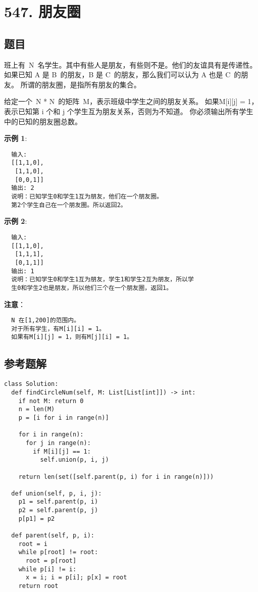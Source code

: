 \newpage
\section{547. 朋友圈}
\label{leetcode:547}

\subsection{题目}

班上有 N 名学生。其中有些人是朋友，有些则不是。他们的友谊具有是传递性。
如果已知 A 是 B 的朋友，B 是 C 的朋友，那么我们可以认为 A 也是 C 的朋友。
所谓的朋友圈，是指所有朋友的集合。

给定一个 N * N 的矩阵 M，表示班级中学生之间的朋友关系。
如果M[i][j] = 1，表示已知第 i 个和 j 个学生互为朋友关系，否则为不知道。
你必须输出所有学生中的已知的朋友圈总数。

\textbf{示例 1}:

\begin{verbatim}
  输入:
  [[1,1,0],
   [1,1,0],
   [0,0,1]]
  输出: 2
  说明：已知学生0和学生1互为朋友，他们在一个朋友圈。
  第2个学生自己在一个朋友圈。所以返回2。
\end{verbatim}

\textbf{示例 2}:

\begin{verbatim}
  输入:
  [[1,1,0],
   [1,1,1],
   [0,1,1]]
  输出: 1
  说明：已知学生0和学生1互为朋友，学生1和学生2互为朋友，所以学
  生0和学生2也是朋友，所以他们三个在一个朋友圈，返回1。
\end{verbatim}

\textbf{注意}：

\begin{verbatim}
  N 在[1,200]的范围内。
  对于所有学生，有M[i][i] = 1。
  如果有M[i][j] = 1，则有M[j][i] = 1。
\end{verbatim}

\subsection{参考题解}

\begin{verbatim}
class Solution:
  def findCircleNum(self, M: List[List[int]]) -> int:
    if not M: return 0
    n = len(M)
    p = [i for i in range(n)]

    for i in range(n):
      for j in range(n):
        if M[i][j] == 1:
          self.union(p, i, j)

    return len(set([self.parent(p, i) for i in range(n)]))

  def union(self, p, i, j):
    p1 = self.parent(p, i)
    p2 = self.parent(p, j)
    p[p1] = p2

  def parent(self, p, i):
    root = i
    while p[root] != root:
      root = p[root]
    while p[i] != i:
      x = i; i = p[i]; p[x] = root
    return root
\end{verbatim}
